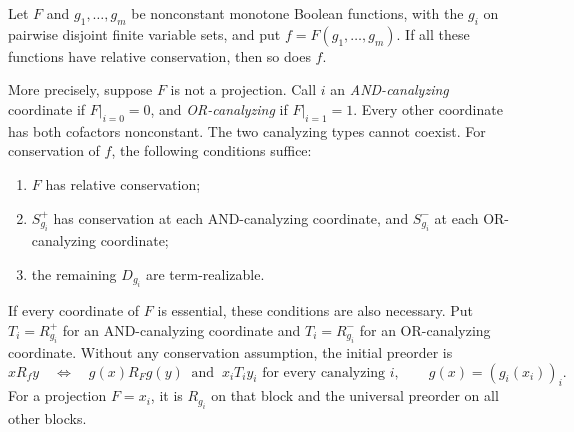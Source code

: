 \begin{theorem}
\label{core:thm:conservation-substitution}
Let $F$ and $g_1,\ldots,g_m$ be nonconstant monotone Boolean functions,
with the $g_i$ on pairwise disjoint finite variable sets, and put
$f=F(g_1,\ldots,g_m)$. If all these functions have relative conservation,
then so does $f$.

More precisely, suppose $F$ is not a projection. Call $i$ an
\emph{AND-canalyzing} coordinate if $F|_{i=0}=0$, and
\emph{OR-canalyzing} if $F|_{i=1}=1$. Every other coordinate has both
cofactors nonconstant. The two canalyzing types cannot coexist.
For conservation of $f$, the following conditions suffice:
\begin{enumerate}[label=(\roman*)]
\item $F$ has relative conservation;
\item $S_{g_i}^+$ has conservation at each AND-canalyzing coordinate,
      and $S_{g_i}^-$ at each OR-canalyzing coordinate;
\item the remaining $D_{g_i}$ are term-realizable.
\end{enumerate}
If every coordinate of $F$ is essential, these conditions are also
necessary. Put
$T_i=R_{g_i}^+$ for an AND-canalyzing coordinate and
$T_i=R_{g_i}^-$ for an OR-canalyzing coordinate. Without any conservation
assumption, the initial preorder is
\[
 xR_fy\quad\Longleftrightarrow\quad
 g(x)R_Fg(y)\ \text{ and }\ x_iT_iy_i
 \text{ for every canalyzing }i,
 \qquad g(x)=(g_i(x_i))_i.
\]
For a projection $F=x_i$, it is $R_{g_i}$ on that block and the universal
preorder on all other blocks.
\end{theorem}
